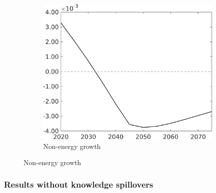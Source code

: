 \begin{figure}[h!!!]
\begin{subfigure}{0.32\textwidth}
\end{subfigure}
\begin{subfigure}{0.32\textwidth}
	\caption{Non-energy growth}
	\includegraphics[width=1\textwidth]{../../codding_model/own_basedOnFried/optimalPol_010922_revision/figures/all_13Sept22_Tplus30/gAn_OPT_COMPtaulPer_regime4_spillover0_knspil0_noskill0_sep0_xgrowth0_PV1_etaa0.79.png}
\end{subfigure}
\end{figure}
\subsubsection{Results without knowledge spillovers}\label{app:TLS}


